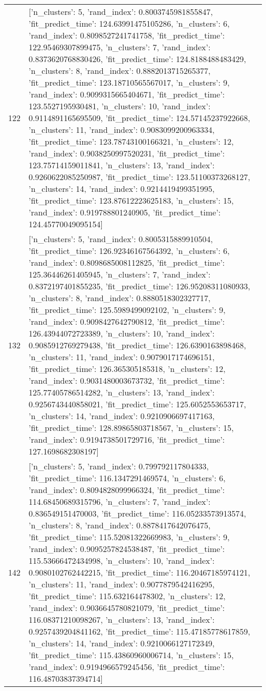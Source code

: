 \begin{tabular}{rl}
122 & [{'n_clusters': 5, 'rand_index': 0.8003745981855847, 'fit_predict_time': 124.63991475105286}, {'n_clusters': 6, 'rand_index': 0.8098527241741758, 'fit_predict_time': 122.95469307899475}, {'n_clusters': 7, 'rand_index': 0.8373620768830426, 'fit_predict_time': 124.8188488483429}, {'n_clusters': 8, 'rand_index': 0.8882013715265377, 'fit_predict_time': 123.18710565567017}, {'n_clusters': 9, 'rand_index': 0.9099315665404671, 'fit_predict_time': 123.5527195930481}, {'n_clusters': 10, 'rand_index': 0.9114891165695509, 'fit_predict_time': 124.57145237922668}, {'n_clusters': 11, 'rand_index': 0.9083099200963334, 'fit_predict_time': 123.78743100166321}, {'n_clusters': 12, 'rand_index': 0.9038250997520231, 'fit_predict_time': 123.75714159011841}, {'n_clusters': 13, 'rand_index': 0.9260622085250987, 'fit_predict_time': 123.51100373268127}, {'n_clusters': 14, 'rand_index': 0.9214419499351995, 'fit_predict_time': 123.87612223625183}, {'n_clusters': 15, 'rand_index': 0.919788801240905, 'fit_predict_time': 124.45770049095154}] \\
132 & [{'n_clusters': 5, 'rand_index': 0.8005315889910504, 'fit_predict_time': 126.92346167564392}, {'n_clusters': 6, 'rand_index': 0.8098685008112825, 'fit_predict_time': 125.36446261405945}, {'n_clusters': 7, 'rand_index': 0.8372197401855235, 'fit_predict_time': 126.95208311080933}, {'n_clusters': 8, 'rand_index': 0.8880518302327717, 'fit_predict_time': 125.5989499092102}, {'n_clusters': 9, 'rand_index': 0.9098427642790812, 'fit_predict_time': 126.43944072723389}, {'n_clusters': 10, 'rand_index': 0.9085912769279438, 'fit_predict_time': 126.6390163898468}, {'n_clusters': 11, 'rand_index': 0.9079017174696151, 'fit_predict_time': 126.365305185318}, {'n_clusters': 12, 'rand_index': 0.9031480003673732, 'fit_predict_time': 125.77405786514282}, {'n_clusters': 13, 'rand_index': 0.9256743440858021, 'fit_predict_time': 125.6052553653717}, {'n_clusters': 14, 'rand_index': 0.9210906697417163, 'fit_predict_time': 128.89865803718567}, {'n_clusters': 15, 'rand_index': 0.9194738501729716, 'fit_predict_time': 127.1698682308197}] \\
142 & [{'n_clusters': 5, 'rand_index': 0.799792117804333, 'fit_predict_time': 116.1347291469574}, {'n_clusters': 6, 'rand_index': 0.8094828099966324, 'fit_predict_time': 114.68450689315796}, {'n_clusters': 7, 'rand_index': 0.836549151470003, 'fit_predict_time': 116.05233573913574}, {'n_clusters': 8, 'rand_index': 0.8878417642076475, 'fit_predict_time': 115.52081322669983}, {'n_clusters': 9, 'rand_index': 0.9095257824538487, 'fit_predict_time': 115.53666472434998}, {'n_clusters': 10, 'rand_index': 0.9080102762442215, 'fit_predict_time': 116.20467185974121}, {'n_clusters': 11, 'rand_index': 0.9077879542416295, 'fit_predict_time': 115.632164478302}, {'n_clusters': 12, 'rand_index': 0.9036645780821079, 'fit_predict_time': 116.08371210098267}, {'n_clusters': 13, 'rand_index': 0.9257439204841162, 'fit_predict_time': 115.47185778617859}, {'n_clusters': 14, 'rand_index': 0.9210066127172349, 'fit_predict_time': 115.43860960006714}, {'n_clusters': 15, 'rand_index': 0.9194966579245456, 'fit_predict_time': 116.48703837394714}] \\

\end{tabular}
